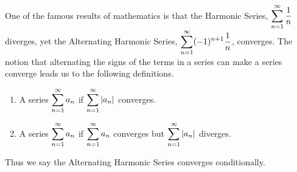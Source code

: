 One of the famous results of mathematics is that the Harmonic Series, $\displaystyle \sum_{n=1}^\infty \frac1n$ diverges, yet the Alternating Harmonic Series, $\displaystyle \sum_{n=1}^\infty (-1)^{n+1}\frac1n$, converges. The notion that alternating the signs of the terms in a series can make a series converge leads us to the following definitions.

{%
\begin{enumerate}
	\item A series $\displaystyle \sum_{n=1}^\infty a_n$  if $\displaystyle \sum_{n=1}^\infty |a_n|$ converges.
	\item A series $\displaystyle \sum_{n=1}^\infty a_n$  if $\displaystyle \sum_{n=1}^\infty a_n$ converges but $\displaystyle \sum_{n=1}^\infty |a_n|$ diverges.
\end{enumerate}
}


Thus we say the Alternating Harmonic Series converges conditionally. \\

